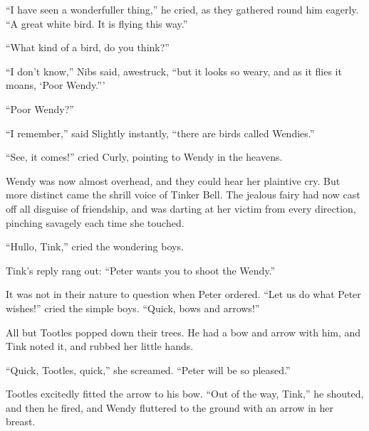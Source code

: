``I have seen a wonderfuller thing,'' he cried, as they gathered round him
eagerly.
``A great white bird. It is flying this way.''

``What kind of a bird, do you think?''

``I don't know,'' Nibs said, awestruck, ``but it looks so weary, and as it flies
it moans, ‘Poor Wendy.'''

``Poor Wendy?''

``I remember,'' said Slightly instantly, ``there are birds called Wendies.''

``See, it comes!'' cried Curly, pointing to Wendy in the heavens.

Wendy was now almost overhead, and they could hear her plaintive cry.
But more distinct came the shrill voice of Tinker Bell.
The jealous fairy had now cast off all disguise of friendship, and was darting
at her victim from every direction, pinching savagely each time she touched.

``Hullo, Tink,'' cried the wondering boys.

Tink's reply rang out: ``Peter wants you to shoot the Wendy.''

It was not in their nature to question when Peter ordered. ``Let us do
what Peter wishes!'' cried the simple boys. ``Quick, bows and arrows!''

All but Tootles popped down their trees. He had a bow and arrow with
him, and Tink noted it, and rubbed her little hands.

``Quick, Tootles, quick,'' she screamed. ``Peter will be so pleased.''

Tootles excitedly fitted the arrow to his bow. ``Out of the way, Tink,''
he shouted, and then he fired, and Wendy fluttered to the ground with
an arrow in her breast.
